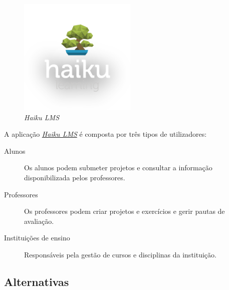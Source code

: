 \begin{figure}[H]
        \centering
        \includegraphics[width=0.5\textwidth]{images/concorrencia/haiku.png}
         \caption{\emph{Haiku LMS}}
         \label{fig: studifi}
\end{figure}

A aplicação \href{http://www.haikulearning.com/}{\emph{Haiku LMS}} é composta por três tipos de utilizadores:

\begin{description}
	\item[Alunos] Os alunos podem submeter projetos e consultar a informação disponibilizada pelos professores.
	\item[Professores] Os professores podem criar projetos e exercícios e gerir pautas de avaliação.
	\item[Instituições de ensino] Responsáveis pela gestão de cursos e disciplinas da instituição.
\end{description}

\subsection{Alternativas} %
\label{sub:alternativas}

